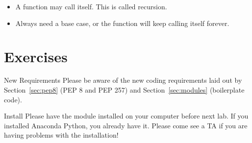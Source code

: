 \documentclass[11pt]{cselabheader}
\begin{document}
\begin{itemize}
  \item A function may call itself. This is called recursion.
  \item Always need a base case, or the function will keep calling itself
    forever.
\end{itemize}

\pagebreak

\section{Exercises}

\begin{warningbox}{New Requirements}
  Please be aware of the new coding requirements laid out by
  Section~\ref{sec:pep8} (PEP 8 and PEP 257) and Section~\ref{sec:modules}
  (boilerplate code).
\end{warningbox}

\begin{warningbox}{Install}
  Please have the  module installed on your computer
  before next lab. If you installed Anaconda Python, you already have it. Please
  come see a TA if you are having problems with the installation!
\end{warningbox}
\end{document}
